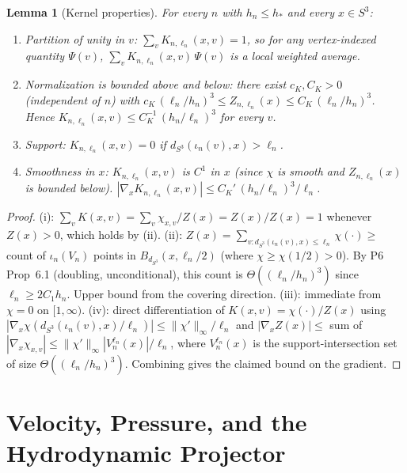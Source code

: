 \documentclass[11pt, a4paper]{amsart}
\newtheorem{lemma}[theorem]{Lemma}
\theoremstyle{definition}
\newcommand{\dsph}{d_{S^3}}
\begin{document}
\begin{lemma}[Kernel properties]
\label{lem:kernel-properties}
For every $n$ with $h_n \leq h_\ast$ and every $x \in S^3$:
\begin{enumerate}
\item[\textup{(i)}] \emph{Partition of unity in $v$:}
  $\sum_v K_{n, \ell_n}(x, v) = 1$, so for any vertex-indexed
  quantity $\Psi(v)$,
  $\sum_v K_{n, \ell_n}(x, v)\,\Psi(v)$ is a local weighted
  average.
\item[\textup{(ii)}] \emph{Normalization is bounded above and
  below:} there exist $c_K, C_K > 0$ (independent of $n$) with
  $c_K\,(\ell_n/h_n)^3 \leq Z_{n, \ell_n}(x) \leq C_K\,
  (\ell_n/h_n)^3$. Hence $K_{n, \ell_n}(x, v) \leq C_K^{-1}\,
  (h_n/\ell_n)^3$ for every $v$.
\item[\textup{(iii)}] \emph{Support:} $K_{n, \ell_n}(x, v) = 0$
  if $\dsph(\iota_n(v), x) > \ell_n$.
\item[\textup{(iv)}] \emph{Smoothness in $x$:} $K_{n, \ell_n}(x,
  v)$ is $C^1$ in $x$ (since $\chi$ is smooth and $Z_{n,
  \ell_n}(x)$ is bounded below). $|\nabla_x K_{n, \ell_n}(x, v)|
  \leq C_K'\,(h_n/\ell_n)^3 / \ell_n$.
\end{enumerate}
\end{lemma}

\begin{proof}
(i): $\sum_v K(x, v) = \sum_v \chi_{x, v} / Z(x) = Z(x)/Z(x)
= 1$ whenever $Z(x) > 0$, which holds by (ii).
(ii): $Z(x) = \sum_{v : \dsph(\iota_n(v), x) \leq \ell_n}
\chi(\cdot) \geq $ count of $\iota_n(V_n)$ points in
$B_\dsph(x, \ell_n/2)$ (where $\chi \geq \chi(1/2) > 0$). By
P6 Prop~6.1 (doubling, unconditional), this count is $\Theta(
(\ell_n/h_n)^3)$ since $\ell_n \geq 2 C_1 h_n$. Upper bound from
the covering direction. (iii): immediate from $\chi = 0$ on
$[1, \infty)$. (iv): direct differentiation of $K(x, v) =
\chi(\cdot)/Z(x)$ using $|\nabla_x \chi(\dsph(\iota_n(v), x)/
\ell_n)| \leq \|\chi'\|_\infty / \ell_n$ and $|\nabla_x Z(x)|
\leq $ sum of $|\nabla_x \chi_{x,v}| \leq \|\chi'\|_\infty
|V_n^{\ell_n}(x)|/\ell_n$, where $V_n^{\ell_n}(x)$ is the
support-intersection set of size $\Theta((\ell_n/h_n)^3)$.
Combining gives the claimed bound on the gradient.
\end{proof}

\section{Velocity, Pressure, and the Hydrodynamic Projector}
\label{sec:observables}
\end{document}
